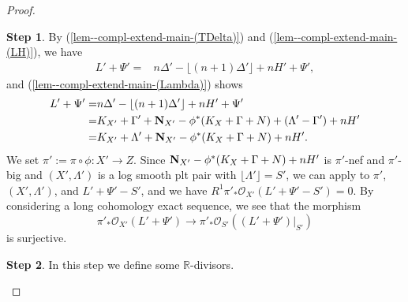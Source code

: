 \documentclass[12pt]{amsart}
\theoremstyle{definition}
\newtheorem{step1}{Step}
\begin{document}
\begin{proof}
\begin{step1}\label{step3--lem-compl-extend-main}
By (\ref{lem--compl-extend-main-(TDelta)}) and (\ref{lem--compl-extend-main-(LH)}), we have
\begin{equation}\label{lem--compl-extend-main-(L-calc)}
\begin{split}
L'+\Psi'=&n\Delta' - \lfloor (n+1)\Delta' \rfloor+nH'+\Psi',
\end{split}
\end{equation}
and (\ref{lem--compl-extend-main-(Lambda)}) shows
\begin{equation*}
\begin{split}
L'+\Psi'=&n\Delta' - \lfloor (n+1)\Delta' \rfloor+nH'+\Psi'\\
=& K_{X'}+\Gamma'+\boldsymbol{\rm N}_{X'}-\phi^{*}(K_{X}+\Gamma+N)+(\Lambda'-\Gamma')+nH'\\
=& K_{X'}+\Lambda'+\boldsymbol{\rm N}_{X'}-\phi^{*}(K_{X}+\Gamma+N)+nH'.
\end{split}
\end{equation*}
We set $\pi':=\pi \circ \phi \colon X' \to Z$. 
Since $\boldsymbol{\rm N}_{X'}-\phi^{*}(K_{X}+\Gamma+N)+nH'$ is $\pi'$-nef and $\pi'$-big and $(X',\Lambda')$ is a log smooth plt pair with $\lfloor \Lambda' \rfloor = S'$, we can apply \cite[II, 5.12 Corollary]{nakayama} to $\pi'$, $(X',\Lambda')$, and $L'+\Psi'-S'$, and we have $R^{1}\pi'_{*}\mathcal{O}_{X'}(L'+\Psi'-S')=0$. 
By considering a long cohomology exact sequence, we see that the morphism
$$\pi'_{*}\mathcal{O}_{X'}(L'+\Psi')\longrightarrow \pi'_{*}\mathcal{O}_{S'}((L'+\Psi')|_{S'})$$
is surjective. 
\end{step1}

\begin{step1}\label{step4--lem-compl-extend-main}
In this step we define some $\mathbb{R}$-divisors. 


\end{step1}
\end{proof}
\end{document}
